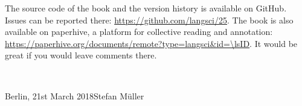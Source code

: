 The source code of the book and the version history is available on GitHub. Issues can be reported
there: \url{https://github.com/langsci/25}. The book is also available on paperhive, a platform for
collective reading and annotation:
\url{https://paperhive.org/documents/remote?type=langsci&id=\lsID}. It would be great if you would
leave comments there.  





%




~\medskip

\noindent
Berlin, 21st March 2018\hfill Stefan Müller




